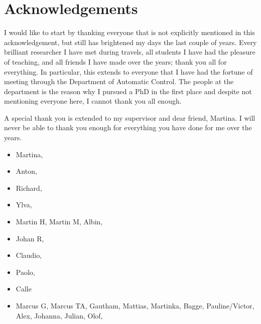 \chapter*{Acknowledgements}
I would like to start by thanking everyone that is not explicitly mentioned in this acknowledgement, but still has brightened my days the last couple of years.
Every brilliant researcher I have met during travels, all students I have had the pleasure of teaching, and all friends I have made over the years; thank you all for everything.
In particular, this extends to everyone that I have had the fortune of meeting through the Department of Automatic Control.
The people at the department is the reason why I pursued a PhD in the first place and despite not mentioning everyone here, I cannot thank you all enough.

A special thank you is extended to my supervisor and dear friend, Martina.
I will never be able to thank you enough for everything you have done for me over the years.

\begin{itemize}
    \item Martina,
    \item Anton,
    \item Richard,
    \item Ylva,
    \item Martin H, Martin M, Albin,
    \item Johan R,
    \item Claudio,
    \item Paolo, 
    \item Calle
    \item Marcus G, Marcus TA, Gautham, Mattias, Martinka, Bagge, Pauline/Victor, Alex, Johanna, Julian, Olof,
\end{itemize}

